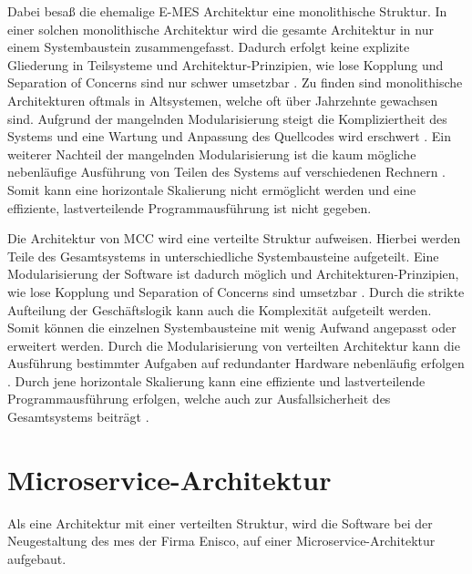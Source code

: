 Dabei besaß die ehemalige E-MES Architektur eine monolithische Struktur. In einer solchen monolithische Architektur wird die gesamte Architektur in nur einem Systembaustein zusammengefasst. Dadurch erfolgt keine explizite Gliederung in Teilsysteme und Architektur-Prinzipien, wie lose Kopplung und Separation of Concerns sind nur schwer umsetzbar \cite{Vogel.2009}. Zu finden sind monolithische Architekturen oftmals in Altsystemen, welche oft über Jahrzehnte gewachsen sind. Aufgrund der mangelnden Modularisierung steigt die Kompliziertheit des Systems und eine Wartung und Anpassung des Quellcodes wird erschwert \cite{Prof.Dr.AndreasFink.2012b}. Ein weiterer Nachteil der mangelnden Modularisierung ist die kaum mögliche nebenläufige Ausführung von Teilen des Systems auf verschiedenen Rechnern \cite{Prof.Dr.AndreasFink.2012b}. Somit kann eine horizontale Skalierung nicht ermöglicht werden und eine effiziente, lastverteilende Programmausführung ist nicht gegeben.

Die Architektur von MCC wird eine verteilte Struktur aufweisen. Hierbei werden Teile des Gesamtsystems in unterschiedliche Systembausteine aufgeteilt. Eine Modularisierung der Software ist dadurch möglich und Architekturen-Prinzipien, wie lose Kopplung und Separation of Concerns sind umsetzbar \cite{Vogel.2009}. Durch die strikte Aufteilung der Geschäftslogik kann auch die Komplexität aufgeteilt werden. Somit können die einzelnen Systembausteine mit wenig Aufwand angepasst oder erweitert werden. Durch die Modularisierung von verteilten Architektur kann die Ausführung bestimmter Aufgaben auf redundanter Hardware nebenläufig erfolgen \cite{Prof.Dr.AndreasFink.2012}. Durch jene horizontale Skalierung kann eine effiziente und lastverteilende Programmausführung erfolgen, welche auch zur Ausfallsicherheit des Gesamtsystems beiträgt \cite{Prof.Dr.AndreasFink.2012}.


\section{Microservice-Architektur\label{sec2.2:Unterpunkt-2}}

Als eine Architektur mit einer verteilten Struktur, wird die Software bei der Neugestaltung des \gls{mes} der Firma Enisco, auf einer Microservice-Architektur aufgebaut.

